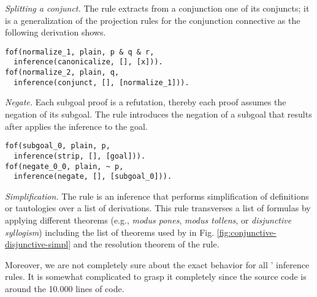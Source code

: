 \documentclass[../main.tex]{subfiles}
\begin{document}

\textit{Splitting a conjunct.} The \conjunct rule extracts from a
conjunction one of its conjuncts; it is a generalization of the
projection rules for the conjunction connective as the
following \TSTP derivation shows.

\begin{verbatim}
fof(normalize_1, plain, p & q & r,
  inference(canonicalize, [], [x])).
fof(normalize_2, plain, q,
  inference(conjunct, [], [normalize_1])).
\end{verbatim}

\textit{Negate.}
Each subgoal proof is a refutation, thereby each proof assumes
the negation of its subgoal. The \negate rule
introduces the negation of a subgoal that results
after applies the \strip inference to the goal.

\begin{verbatim}
fof(subgoal_0, plain, p,
  inference(strip, [], [goal])).
fof(negate_0_0, plain, ~ p,
  inference(negate, [], [subgoal_0])).
\end{verbatim}


\textit{Simplification.}
The \simplify rule is an inference that performs simplification of
definitions or tautologies over a list of derivations. This rule
transverses a list of formulas by applying different theorems (e.g.,
\emph{modus pones}, \emph{modus tollens}, or \emph{disjunctive
syllogism}) including the list of theorems used by \canonicalize in
Fig. \ref{fig:conjunctive-disjunctive-simpl} and the resolution
theorem of the \resolve rule.

Moreover, we are not completely sure about the exact behavior for
all \Metis' inference rules. It is somewhat complicated to grasp it
completely since the source code is around the 10.000 lines of code.
\end{document}
